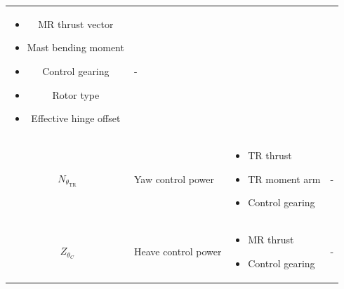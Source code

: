 \documentclass[
]{book}
\providecommand{\tightlist}{%
  \setlength{\itemsep}{0pt}\setlength{\parskip}{0pt}}
\begin{document}
\begin{longtable}[]{@{}cllc@{}}
\begin{minipage}[t]{0.27\columnwidth}
\begin{itemize}
\tightlist
\item
  MR thrust vector
\item
  Mast bending moment
\item
  Control gearing
\item
  Rotor type
\item
  Effective hinge offset
\end{itemize}\strut
\end{minipage} & \begin{minipage}[t]{0.16\columnwidth}\centering
-\strut
\end{minipage}\tabularnewline
\begin{minipage}[t]{0.25\columnwidth}\centering
\(N_{\theta_{\text{TR}}}\)\strut
\end{minipage} & \begin{minipage}[t]{0.21\columnwidth}\raggedright
Yaw control power\strut
\end{minipage} & \begin{minipage}[t]{0.27\columnwidth}\raggedright
\begin{itemize}
\tightlist
\item
  TR thrust
\item
  TR moment arm
\item
  Control gearing
\end{itemize}\strut
\end{minipage} & \begin{minipage}[t]{0.16\columnwidth}\centering
-\strut
\end{minipage}\tabularnewline
\begin{minipage}[t]{0.25\columnwidth}\centering
\(Z_{\theta_C}\)\strut
\end{minipage} & \begin{minipage}[t]{0.21\columnwidth}\raggedright
Heave control power\strut
\end{minipage} & \begin{minipage}[t]{0.27\columnwidth}\raggedright
\begin{itemize}
\tightlist
\item
  MR thrust
\item
  Control gearing
\end{itemize}\strut
\end{minipage} & \begin{minipage}[t]{0.16\columnwidth}\centering
-\strut
\end{minipage}\tabularnewline
\bottomrule
\end{longtable}
\end{document}
